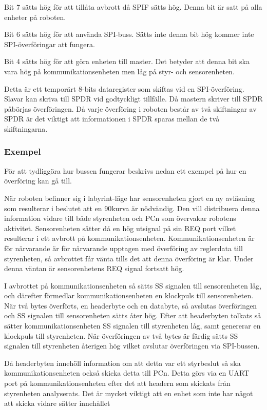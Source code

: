 Bit 7 sätts hög för att tillåta avbrott då SPIF sätts hög. Denna bit är satt på alla enheter på roboten.

Bit 6 sätts hög för att använda SPI-buss. Sätts inte denna bit hög kommer inte SPI-överföringar att fungera.

Bit 4 sätts hög för att göra enheten till master. Det betyder att denna bit ska vara hög på kommunikationsenheten men låg på styr- och sensorenheten.

Detta är ett temporärt 8-bits dataregister som skiftas vid en SPI-överföring. Slavar kan skriva till SPDR vid godtyckligt tillfälle. Då mastern skriver till SPDR påbörjas överföringen. Då varje överföring i roboten består av två skiftningar av SPDR är det viktigt att informationen i SPDR sparas mellan de två skiftningarna.


\subsubsection{Exempel}

För att tydliggöra hur bussen fungerar beskrivs nedan ett exempel på hur en överföring kan gå till.

När roboten befinner sig i labyrint-läge har sensorenheten gjort en ny avläsning som resulterar i beslutet att en 90\degree kurva är nödvändig. Den vill distribuera denna information vidare till både styrenheten och PCn som övervakar robotens aktivitet. Sensorenheten sätter då en hög utsignal på sin REQ port vilket resulterar i ett avbrott på kommunikationsenheten. Kommunikationsenheten är för närvarande är för närvarande upptagen med överföring av reglerdata till styrenheten, så avbrottet får vänta tills det att denna överföring är klar. Under denna väntan är sensorenhetens REQ signal fortsatt hög.

I avbrottet på kommunikationsenheten så sätts SS signalen till sensorenheten låg, och därefter förmedlar kommunikationsenheten en klockpuls till sensorenheten. När två bytes överförts, en headerbyte och en databyte, så avslutas överföringen och SS signalen till sensorenheten sätts åter hög. Efter att headerbyten tolkats så sätter kommunikationsenheten SS signalen till styrenheten låg, samt genererar en klockpuls till styrenheten. När överföringen av två bytes är färdig sätts SS signalen till styrenheten återigen hög vilket avslutar överföringen via SPI-bussen. 

Då headerbyten innehöll information om att detta var ett styrbeslut så ska kommunikationsenheten också skicka detta till PCn. Detta görs via en UART port på kommunikationsenheten efter det att headern som skickats från styrenheten analyserats. Det är mycket viktigt att en enhet som inte har något att skicka vidare sätter innehållet 

